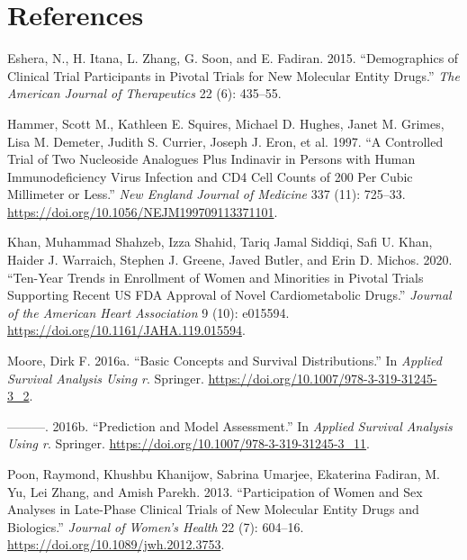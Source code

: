 \documentclass[
  letterpaper,
  DIV=11,
  numbers=noendperiod]{scrartcl}
\newlength{\cslhangindent}
\newenvironment{CSLReferences}[2] %
 {\begin{list}{}{%
  \setlength{\itemindent}{0pt}
  \setlength{\leftmargin}{0pt}
  \setlength{\parsep}{0pt}
  \ifodd #1
   \setlength{\leftmargin}{\cslhangindent}
   \setlength{\itemindent}{-1\cslhangindent}
  \fi
  \setlength{\itemsep}{#2\baselineskip}}}
 {\end{list}}
\begin{document}
\section*{References}\label{references}

\label{refs}
\begin{CSLReferences}{1}{0}
Eshera, N., H. Itana, L. Zhang, G. Soon, and E. Fadiran. 2015.
{``Demographics of Clinical Trial Participants in Pivotal Trials for New
Molecular Entity Drugs.''} \emph{The American Journal of Therapeutics}
22 (6): 435--55.

Hammer, Scott M., Kathleen E. Squires, Michael D. Hughes, Janet M.
Grimes, Lisa M. Demeter, Judith S. Currier, Joseph J. Eron, et al. 1997.
{``A Controlled Trial of Two Nucleoside Analogues Plus Indinavir in
Persons with Human Immunodeficiency Virus Infection and {CD4} Cell
Counts of 200 Per Cubic Millimeter or Less.''} \emph{New England Journal
of Medicine} 337 (11): 725--33.
\url{https://doi.org/10.1056/NEJM199709113371101}.

Khan, Muhammad Shahzeb, Izza Shahid, Tariq Jamal Siddiqi, Safi U. Khan,
Haider J. Warraich, Stephen J. Greene, Javed Butler, and Erin D. Michos.
2020. {``Ten-Year Trends in Enrollment of Women and Minorities in
Pivotal Trials Supporting Recent {US} {FDA} Approval of Novel
Cardiometabolic Drugs.''} \emph{Journal of the American Heart
Association} 9 (10): e015594.
\url{https://doi.org/10.1161/JAHA.119.015594}.

Moore, Dirk F. 2016a. {``Basic Concepts and Survival Distributions.''}
In \emph{Applied Survival Analysis Using r}. Springer.
\url{https://doi.org/10.1007/978-3-319-31245-3_2}.

---------. 2016b. {``Prediction and Model Assessment.''} In
\emph{Applied Survival Analysis Using r}. Springer.
\url{https://doi.org/10.1007/978-3-319-31245-3_11}.

Poon, Raymond, Khushbu Khanijow, Sabrina Umarjee, Ekaterina Fadiran, M.
Yu, Lei Zhang, and Amish Parekh. 2013. {``Participation of Women and Sex
Analyses in Late-Phase Clinical Trials of New Molecular Entity Drugs and
Biologics.''} \emph{Journal of Women's Health} 22 (7): 604--16.
\url{https://doi.org/10.1089/jwh.2012.3753}.


\end{CSLReferences}
\end{document}
